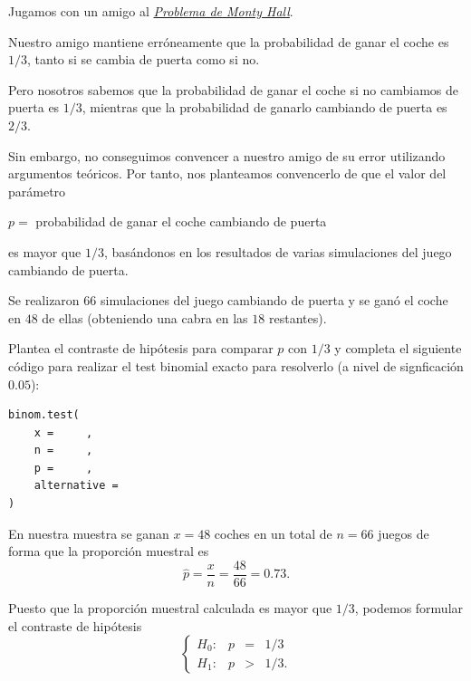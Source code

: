 \documentclass[
  notoc,
  nobib,
  degree=inf]{mnye}
\begin{document}
\begin{ex}

Jugamos con un amigo al \href{https://www.mathwarehouse.com/monty-hall-simulation-online/}{\emph{Problema de Monty Hall}}.

Nuestro amigo mantiene erróneamente que la probabilidad de ganar el coche es \(1/3\), tanto si se cambia de puerta como si no.

Pero nosotros sabemos que la probabilidad de ganar el coche si no cambiamos de puerta es \(1/3\), mientras que la probabilidad de ganarlo cambiando de puerta es \(2/3\).

Sin embargo, no conseguimos convencer a nuestro amigo de su error utilizando argumentos teóricos. Por tanto, nos planteamos convencerlo de que el valor del parámetro

\begin{center}
\(p =\)
probabilidad de ganar el coche cambiando de puerta

\end{center}

es mayor que \(1/3\), basándonos en los resultados de varias simulaciones del juego cambiando de puerta.

Se realizaron \(66\) simulaciones del juego cambiando de puerta y se ganó el coche en \(48\) de ellas (obteniendo una cabra en las \(18\) restantes).

\begin{parts}

\item

Plantea el contraste de hipótesis para comparar \(p\) con \(1/3\) y completa el siguiente código para realizar el test binomial exacto para resolverlo (a nivel de signficación \(0.05\)):

\begin{verbatim}
binom.test(
    x =     ,
    n =     ,
    p =     ,
    alternative =
)
\end{verbatim}

\begin{sol}

En nuestra muestra se ganan \(x=48\) coches en un total de \(n=66\) juegos de forma que la proporción muestral es
\[
\hat p = \frac{x}{n} = \frac{48}{66}  = 0.73.
\]

Puesto que la proporción muestral calculada es mayor que \(1/3\), podemos formular el contraste de hipótesis
\[
  \left\{
  \begin{array}{lrcl}
    H_0:&p&=&1/3\\
    H_1:&p&>&1/3.
  \end{array}
  \right.
\]


\end{sol}
\end{parts}
\end{ex}
\end{document}
